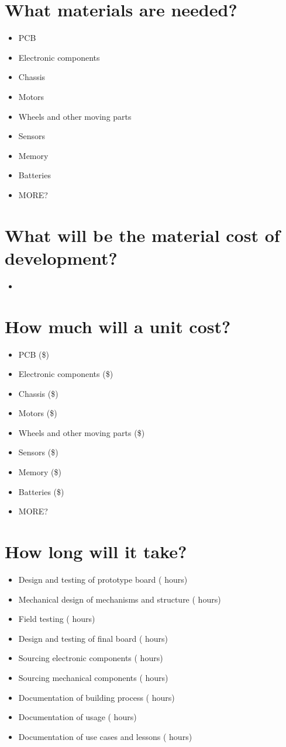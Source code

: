 \documentclass[11pt]{article}
\begin{document}
\section{What materials are needed?}
\begin{itemize}
\item PCB
\item Electronic components
\item Chassis
\item Motors
\item Wheels and other moving parts
\item Sensors
\item Memory
\item Batteries
\item MORE?
\end{itemize}

\section{What will be the material cost of development?}
\begin{itemize}
\item
\end{itemize}


\section{How much will a unit cost?}
\begin{itemize}
\item PCB (\$)
\item Electronic components (\$)
\item Chassis (\$)
\item Motors (\$)
\item Wheels and other moving parts (\$)
\item Sensors (\$)
\item Memory (\$)
\item Batteries (\$)
\item MORE?
\end{itemize}

\section{How long will it take?}
\begin{itemize}
\item Design and testing of prototype board ( hours)
\item Mechanical design of mechanisms and structure ( hours)
\item Field testing ( hours)
\item Design and testing of final board ( hours)
\item Sourcing electronic components ( hours)
\item Sourcing mechanical components ( hours)
\item Documentation of building process ( hours)
\item Documentation of usage ( hours)
\item Documentation of use cases and lessons ( hours)
\end{itemize}
\end{document}

